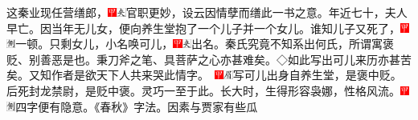这秦业现任营缮郎，{\includegraphics[width=3mm]{../Images/00002}\includegraphics[width=3mm]{../Images/00012}\footnotesize \kaishu 官职更妙，设云因情孽而缮此一书之意。}年近七十，夫人早亡。因当年无儿女，便向养生堂抱了一个儿子并一个女儿。谁知儿子又死了，{\includegraphics[width=3mm]{../Images/00002}\includegraphics[width=3mm]{../Images/00011}\footnotesize \kaishu 一顿。}只剩女儿，小名唤可儿，{\includegraphics[width=3mm]{../Images/00002}\includegraphics[width=3mm]{../Images/00012}\footnotesize \kaishu 出名。秦氏究竟不知系出何氏，所谓寓褒贬、别善恶是也。秉刀斧之笔、具菩萨之心亦甚难矣。◇如此写出可儿来历亦甚苦矣。又知作者是欲天下人共来哭此情字。　\includegraphics[width=3mm]{../Images/00002}\includegraphics[width=3mm]{../Images/00010}\footnotesize \kaishu 写可儿出身自养生堂，是褒中贬。后死封龙禁尉，是贬中褒。灵巧一至于此。}长大时，生得形容袅娜，性格风流。{\includegraphics[width=3mm]{../Images/00002}\includegraphics[width=3mm]{../Images/00011}\footnotesize \kaishu 四字便有隐意。《春秋》字法。}因素与贾家有些瓜